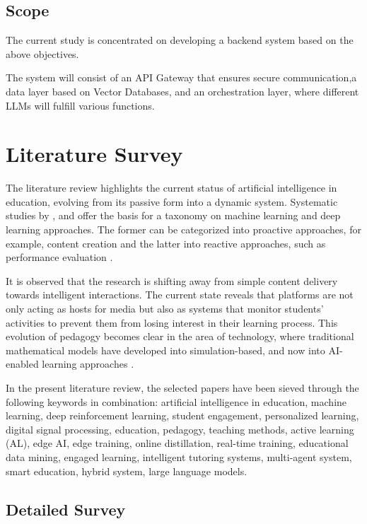 \documentclass[conference]{IEEEtran}
\begin{document}
\subsection{Scope}
The current study is concentrated on developing a backend system based on the above objectives.

The system will consist of an API Gateway that ensures secure communication,a data layer based on Vector Databases, and an orchestration layer, where different LLMs will fulfill various functions.


\section{Literature Survey}

The literature review highlights the current status of artificial intelligence in education, evolving from its passive form into a dynamic system. Systematic studies by \textcite{chen2020}, \textcite{elbasi2025} and \textcite{agbewali2022} offer the basis for a taxonomy on machine learning and deep learning approaches. The former can be categorized into proactive approaches, for example, content creation and the latter into reactive approaches, such as performance evaluation \cite{mallik2023}. 

It is observed that the research is shifting away from simple content delivery towards intelligent interactions. The current state reveals that platforms are not only acting as hosts for media but also as systems that monitor students' activities to prevent them from losing interest in their learning process. This evolution of pedagogy becomes clear in the area of technology, where traditional mathematical models have developed into simulation-based, and now into AI-enabled learning approaches \cite{lopez2025, boldo2024}.

In the present literature review, the selected papers have been sieved through the following keywords in combination: artificial intelligence in education, machine learning, deep reinforcement learning, student engagement, personalized learning, digital signal processing, education, pedagogy, teaching methods, active learning (AL), edge AI, edge training, online distillation, real-time training, educational data mining, engaged learning, intelligent tutoring systems, multi-agent system, smart education, hybrid system, large language models.

\subsection{Detailed Survey}
\end{document}
